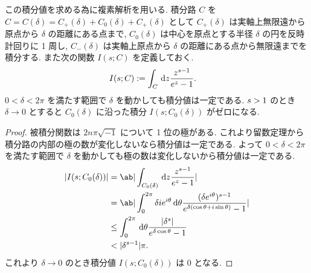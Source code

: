 \documentclass[uplatex,diffipdfmx,a4paper,11pt]{jlreq}
\begin{document}
\begin{proposition}
  この積分値を求める為に複素解析を用いる. 積分路 $C$ を $C = C(\delta) = C_+(\delta) + C_0(\delta) + C_+(\delta)$ として $C_+(\delta)$ は実軸上無限遠から原点から $\delta$ の距離にある点まで, $C_0(\delta)$ は中心を原点とする半径 $\delta$ の円を反時計回りに 1 周し, $C_-(\delta)$ は実軸上原点から $\delta$ の距離にある点から無限遠までを積分する. また次の関数 $I(s; C)$ を定義しておく.
  \begin{align}
    I(s; C) & := \int_C\dl{z}\frac{z^{s-1}}{e^z - 1}.
  \end{align}
  $0 <\delta < 2\pi$ を満たす範囲で $\delta$ を動かしても積分値は一定である.
  $\real s > 1$ のとき $\delta\to 0$ とすると $C_0(\delta)$ に沿った積分 $I(s;C_0(\delta))$ がゼロになる.
\end{proposition}
\begin{proof}
  被積分関数は $2n\pi\sqrt{-1}$ について 1 位の極がある. これより留数定理から積分路の内部の極の数が変化しないなら積分値は一定である. よって $0 <\delta < 2\pi$ を満たす範囲で $\delta$ を動かしても極の数は変化しないから積分値は一定である.
  \begin{align}
    |I(s;C_0(\delta))| & = \ab|\int_{C_0(\delta)}\dl{z}\frac{z^{s-1}}{e^z - 1}|                                                                        \\
                       & = \ab|\int_0^{2\pi}\delta ie^{i\theta}\dl{\theta}\frac{(\delta e^{i\theta})^{s-1}}{e^{\delta(\cos\theta + i\sin\theta)} - 1}| \\
                       & \leq \int_0^{2\pi}\dl{\theta}\frac{|\delta^s|}{e^{\delta\cos\theta} - 1}                                                      \\
                       & < |\delta^{s-1}|\pi.
  \end{align}
  これより $\delta\to 0$ のとき積分値 $I(s; C_0(\delta))$ は $0$ となる.
\end{proof}
\end{document}

